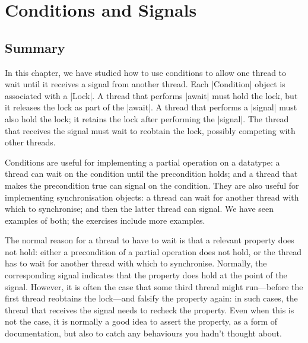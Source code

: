 \chapter{Conditions and Signals} 
\label{chap:conditions}




\section{Summary}

In this chapter, we have studied how to use conditions to allow one thread to
wait until it receives a signal from another thread.  Each |Condition| object
is associated with a |Lock|.  A thread that performs |await| must hold the
lock, but it releases the lock as part of the |await|.  A thread that
performs a |signal| must also hold the lock; it retains the lock after
performing the |signal|.  The thread that receives the signal must wait to
reobtain the lock, possibly competing with other threads.

Conditions are useful for implementing a partial operation on a datatype: a
thread can wait on the condition until the precondition holds; and a thread
that makes the precondition true can signal on the condition.  They are also
useful for implementing synchronisation objects: a thread can wait for another
thread with which to synchronise; and then the latter thread can signal.  We
have seen examples of both; the exercises include more examples.

The normal reason for a thread to have to wait is that a relevant property
does not hold: either a precondition of a partial operation does not hold, or
the thread has to wait for another thread with which to synchronise. 
Normally, the corresponding signal indicates that the property does hold
at the point of the signal.  However, it is often the case that some third
thread might run---before the first thread reobtains the lock---and falsify the
property again: in such cases, the thread that receives the signal needs
to recheck the property.  Even when this is not the case, it is normally a
good idea to assert the property, as a form of documentation, but also to
catch any behaviours you hadn't thought about.

